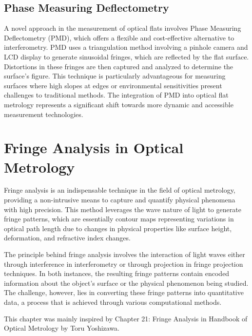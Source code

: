 \documentclass[../main.tex]{subfiles}
\begin{document}
\subsection{Phase Measuring Deflectometry}
\vspace{-15pt}
A novel approach in the measurement of optical flats involves Phase Measuring Deflectometry (PMD), which offers a flexible and cost-effective alternative to interferometry. PMD uses a triangulation method involving a pinhole camera and LCD display to generate sinusoidal fringes, which are reflected by the flat surface. Distortions in these fringes are then captured and analyzed to determine the surface's figure. This technique is particularly advantageous for measuring surfaces where high slopes at edges or environmental sensitivities present challenges to traditional methods. The integration of PMD into optical flat metrology represents a significant shift towards more dynamic and accessible measurement technologies. \cite{WOS:000385319500019}
\vspace{-15pt}
\section{Fringe Analysis in Optical Metrology}
\vspace{-15pt}
Fringe analysis is an indispensable technique in the field of optical metrology, providing a non-intrusive means to capture and quantify physical phenomena with high precision. This method leverages the wave nature of light to generate fringe patterns, which are essentially contour maps representing variations in optical path length due to changes in physical properties like surface height, deformation, and refractive index changes.

The principle behind fringe analysis involves the interaction of light waves either through interference in interferometry or through projection in fringe projection techniques. In both instances, the resulting fringe patterns contain encoded information about the object's surface or the physical phenomenon being studied. The challenge, however, lies in converting these fringe patterns into quantitative data, a process that is achieved through various computational methods.

This chapter was mainly inspired by Chapter 21: Fringe Analysis in Handbook of Optical Metrology by Toru Yoshizawa. \cite{fringe_analysis}
\vspace{-15pt}
\end{document}
